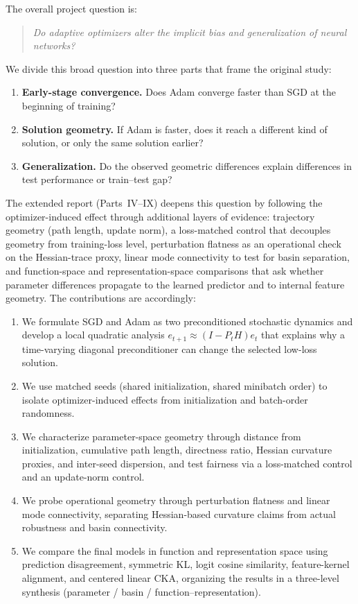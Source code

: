 \documentclass[11pt]{article}
\begin{document}
The overall project question is:
\begin{quote}
\emph{Do adaptive optimizers alter the implicit bias and generalization of neural networks?}
\end{quote}
We divide this broad question into three parts that frame the original study:
\begin{enumerate}
    \item \textbf{Early-stage convergence.} Does Adam converge faster than SGD at the beginning of training?
    \item \textbf{Solution geometry.} If Adam is faster, does it reach a different kind of solution, or only the same solution earlier?
    \item \textbf{Generalization.} Do the observed geometric differences explain differences in test performance or train--test gap?
\end{enumerate}
The extended report (Parts~IV--IX) deepens this question by following the optimizer-induced effect through additional layers of evidence: trajectory geometry (path length, update norm), a loss-matched control that decouples geometry from training-loss level, perturbation flatness as an operational check on the Hessian-trace proxy, linear mode connectivity to test for basin separation, and function-space and representation-space comparisons that ask whether parameter differences propagate to the learned predictor and to internal feature geometry. The contributions are accordingly:
\begin{enumerate}
    \item We formulate SGD and Adam as two preconditioned stochastic dynamics and develop a local quadratic analysis $e_{t+1}\approx (I-P_tH)e_t$ that explains why a time-varying diagonal preconditioner can change the selected low-loss solution.
    \item We use matched seeds (shared initialization, shared minibatch order) to isolate optimizer-induced effects from initialization and batch-order randomness.
    \item We characterize parameter-space geometry through distance from initialization, cumulative path length, directness ratio, Hessian curvature proxies, and inter-seed dispersion, and test fairness via a loss-matched control and an update-norm control.
    \item We probe operational geometry through perturbation flatness and linear mode connectivity, separating Hessian-based curvature claims from actual robustness and basin connectivity.
    \item We compare the final models in function and representation space using prediction disagreement, symmetric KL, logit cosine similarity, feature-kernel alignment, and centered linear CKA, organizing the results in a three-level synthesis (parameter / basin / function--representation).
\end{enumerate}
\end{document}
